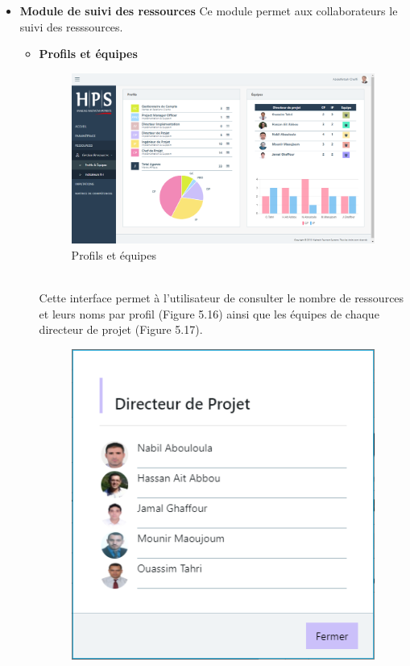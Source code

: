 \begin{itemize}[label=\textbullet]
\item \textbf{Module de suivi des ressources}
	Ce module permet aux collaborateurs le suivi des resssources.
\begin{itemize}
\item \textbf{Profils et équipes }
\begin{figure}[h!]  
			\centering
			\includegraphics[width=1\textwidth]{chapitre5/Figures/proequ.png}
			\caption{Profils et équipes}
			\end{figure}
\\
Cette interface permet à l'utilisateur de consulter le nombre de ressources et leurs noms par profil (Figure 5.16) ainsi que les équipes de chaque directeur de projet (Figure 5.17).
\begin{figure}[h]
    \begin{minipage}[c]{.46\linewidth}
        \centering
        \includegraphics[width=1\textwidth]{chapitre5/Figures/profil.png}

\end{minipage}
\end{figure}
\end{itemize}
\end{itemize}
